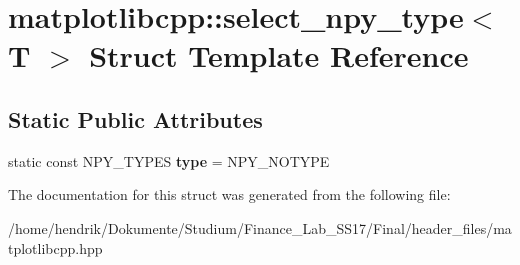 \hypertarget{structmatplotlibcpp_1_1select__npy__type}{}\section{matplotlibcpp\+:\+:select\+\_\+npy\+\_\+type$<$ T $>$ Struct Template Reference}
\label{structmatplotlibcpp_1_1select__npy__type}
\subsection*{Static Public Attributes}
\begin{DoxyCompactItemize}
\item 
static const N\+P\+Y\+\_\+\+T\+Y\+P\+ES {\bfseries type} = N\+P\+Y\+\_\+\+N\+O\+T\+Y\+PE\hypertarget{structmatplotlibcpp_1_1select__npy__type_acbffa4e6e1d047b52e12330446816c9c}{}\label{structmatplotlibcpp_1_1select__npy__type_acbffa4e6e1d047b52e12330446816c9c}

\end{DoxyCompactItemize}


The documentation for this struct was generated from the following file\+:\begin{DoxyCompactItemize}
\item 
/home/hendrik/\+Dokumente/\+Studium/\+Finance\+\_\+\+Lab\+\_\+\+S\+S17/\+Final/header\+\_\+files/matplotlibcpp.\+hpp\end{DoxyCompactItemize}
